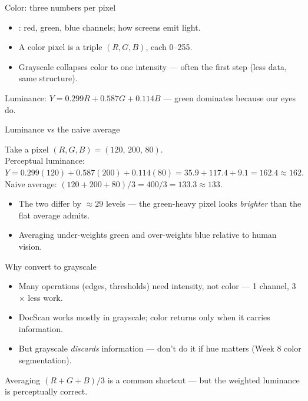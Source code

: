 \documentclass[10pt,aspectratio=169]{beamer}
\begin{document}
\begin{frame}{Color: three numbers per pixel}
  \begin{itemize}
    \item {}: red, green, blue channels; how screens emit light.
    \item A color pixel is a triple $(R,G,B)$, each 0--255.
    \item Grayscale collapses color to one intensity — often the first step (less data, same structure).
  \end{itemize}
  \begin{mathbox}
    Luminance: $Y = 0.299R + 0.587G + 0.114B$ — green dominates because our eyes do.
  \end{mathbox}
\end{frame}

\begin{frame}{Luminance vs the naive average}
  \begin{mathbox}
    Take a pixel \((R,G,B) = (120,\,200,\,80)\). \\[3pt]
    Perceptual luminance:
    \(Y = 0.299(120) + 0.587(200) + 0.114(80) = 35.9 + 117.4 + 9.1 = 162.4 \approx 162.\) \\[3pt]
    Naive average:
    \((120 + 200 + 80)/3 = 400/3 = 133.3 \approx 133.\)
  \end{mathbox}
  \begin{itemize}
    \item The two differ by \(\approx 29\) levels — the green-heavy pixel looks \emph{brighter}
      than the flat average admits.
    \item Averaging under-weights green and over-weights blue relative to human vision.
  \end{itemize}
\end{frame}

\begin{frame}{Why convert to grayscale}
  \begin{itemize}
    \item Many operations (edges, thresholds) need intensity, not color — 1 channel, 3$\times$ less work.
    \item DocScan works mostly in grayscale; color returns only when it carries information.
    \item But grayscale \emph{discards} information — don't do it if hue matters (Week 8 color segmentation).
  \end{itemize}
  \begin{badbox}
    Averaging $(R+G+B)/3$ is a common shortcut — but the weighted luminance is perceptually correct.
  \end{badbox}
\end{frame}
\end{document}

